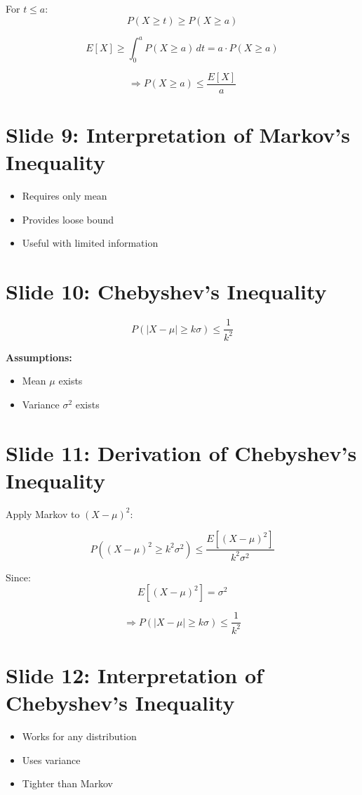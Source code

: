 \documentclass[12pt]{article}
\begin{document}
For $t \leq a$:
\[
P(X \geq t) \geq P(X \geq a)
\]

\[
E[X] \geq \int_0^a P(X \geq a)\, dt = a \cdot P(X \geq a)
\]

\[
\Rightarrow P(X \geq a) \leq \frac{E[X]}{a}
\]

\section*{Slide 9: Interpretation of Markov’s Inequality}
\begin{itemize}
    \item Requires only mean
    \item Provides loose bound
    \item Useful with limited information
\end{itemize}

\section*{Slide 10: Chebyshev’s Inequality}
\[
P(|X - \mu| \geq k\sigma) \leq \frac{1}{k^2}
\]

\textbf{Assumptions:}
\begin{itemize}
    \item Mean $\mu$ exists
    \item Variance $\sigma^2$ exists
\end{itemize}

\section*{Slide 11: Derivation of Chebyshev’s Inequality}
Apply Markov to $(X - \mu)^2$:

\[
P((X - \mu)^2 \geq k^2\sigma^2) \leq \frac{E[(X - \mu)^2]}{k^2\sigma^2}
\]

Since:
\[
E[(X - \mu)^2] = \sigma^2
\]

\[
\Rightarrow P(|X - \mu| \geq k\sigma) \leq \frac{1}{k^2}
\]

\section*{Slide 12: Interpretation of Chebyshev’s Inequality}
\begin{itemize}
    \item Works for any distribution
    \item Uses variance
    \item Tighter than Markov
\end{itemize}
\end{document}
